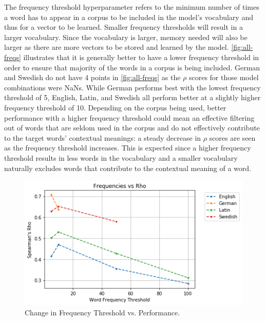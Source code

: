 The frequency threshold hyperparameter refers to the minimum number of times a word has to appear in a corpus to be included in the model’s vocabulary and thus for a vector to be learned. Smaller frequency thresholds will result in a larger vocabulary. Since the vocabulary is larger, memory needed will also be larger as there are more vectors to be stored and learned by the model.  \autoref{fig:all-freqs} illustrates that it is generally better to have a lower frequency threshold in order to ensure that majority of the words in a corpus is being included. German and Swedish do not have 4 points in \autoref{fig:all-freqs} as the $\rho$ scores for those model combinations were NaNs. While German performs best with the lowest frequency threshold of 5, English, Latin, and Swedish all perform better at a slightly higher frequency threshold of 10. Depending on the corpus being used, better performance with a higher frequency threshold could mean an effective filtering out of words that are seldom used in the corpus and do not effectively contribute to the target words' contextual meanings: a steady decrease in $\rho$ scores are seen as the frequency threshold increases. This is expected since a higher frequency threshold results in less words in the vocabulary and a smaller vocabulary naturally excludes words that contribute to the contextual meaning of a word. 

\begin{figure}[h]
  \centering
  \includegraphics[width=.8\linewidth]{sections/figures/freqs_all.png}
  \caption{Change in Frequency Threshold vs. Performance.}
  \label{fig:all-freqs}
\end{figure}


